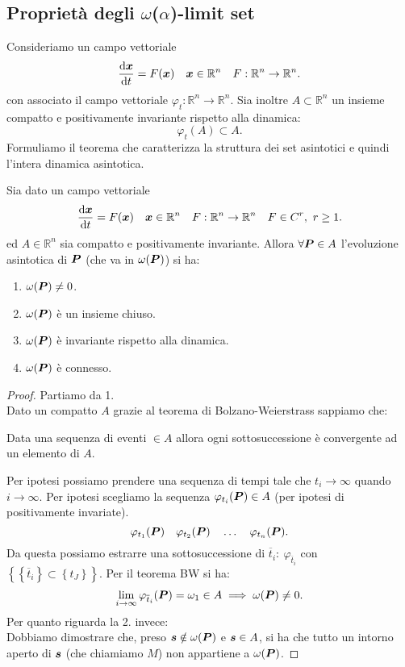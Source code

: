 \subsection{Proprietà degli  $\omega$($\alpha$)-limit set}%
Consideriamo un campo vettoriale 
\[
    \frac{\text{d} \boldsymbol{x}}{\text{d} t} = F(\boldsymbol{x}) \quad  \boldsymbol{x}\in \mathbb{R}^n \quad  F: \mathbb{R}^n\to \mathbb{R}^n
.\] 
con associato il campo vettoriale $\varphi_t:\mathbb{R}^n\to \mathbb{R}^n$. Sia inoltre $A \subset \mathbb{R}^n$ un insieme compatto e positivamente invariante rispetto alla dinamica:
\[
    \varphi_t(A) \subset A
.\] 
Formuliamo il teorema che caratterizza la struttura dei set asintotici e quindi l'intera dinamica asintotica.
\begin{thm}
    Sia dato un campo vettoriale 
    \[
	\frac{\text{d} \boldsymbol{x}}{\text{d} t} = F(\boldsymbol{x}) \quad  \boldsymbol{x}\in \mathbb{R}^n \quad  F:\mathbb{R}^n\to \mathbb{R}^n \quad  F \in C^r, \ r\ge 1
    .\] 
    ed $A \in \mathbb{R}^n$ sia compatto e positivamente invariante. Allora $\forall \boldsymbol{P} \in A$ l'evoluzione asintotica di $\boldsymbol{P}$ (che va in $\omega (\boldsymbol{P})$) si ha:
    \begin{enumerate}
	\item $\omega (\boldsymbol{P}) \neq 0$.
	\item $\omega (\boldsymbol{P})$ è un insieme chiuso.
	\item $\omega (\boldsymbol{P})$ è invariante rispetto alla dinamica.
	\item $\omega (\boldsymbol{P})$ è connesso.
    \end{enumerate}
\end{thm}
\noindent 
\begin{proof}
Partiamo da 1.\\
Dato un compatto $A$ grazie al teorema di Bolzano-Weierstrass sappiamo che:
\begin{center}
    Data una sequenza di eventi $\in A$ allora ogni sottosuccessione è convergente ad un elemento di $A$.
\end{center}
Per ipotesi possiamo prendere una sequenza di tempi tale che $t_i\to \infty$ quando $i\to \infty$. Per ipotesi scegliamo la sequenza $\varphi_{t_i}(\boldsymbol{P}) \in A$ (per ipotesi di positivamente invariate).
\[
    \varphi_{t_1}(\boldsymbol{P}) \quad  \varphi_{t_2}(\boldsymbol{P}) \quad \ldots \quad \varphi_{t_n}(\boldsymbol{P}) 
.\] 
Da questa possiamo estrarre una sottosuccessione di $\overline{t}_i: \ \varphi_{\overline{t}_i}$ con $\left\{\left\{\overline{t}_i\right\} \subset \left\{t_J\right\}\right\}$. Per il teorema BW si ha:
\[
    \lim_{i \to \infty} \varphi_{\overline{t}_i}(\boldsymbol{P}) = \omega_1 \in A \implies  \omega (\boldsymbol{P}) \neq 0
.\] 
Per quanto riguarda la 2. invece:\\
Dobbiamo dimostrare che, preso $\boldsymbol{s}\notin \omega(\boldsymbol{P})$ e $\boldsymbol{s}\in A$, si ha che tutto un intorno aperto di $\boldsymbol{s}$ (che chiamiamo $M$) non appartiene a $\omega (\boldsymbol{P})$. 
\end{proof}
